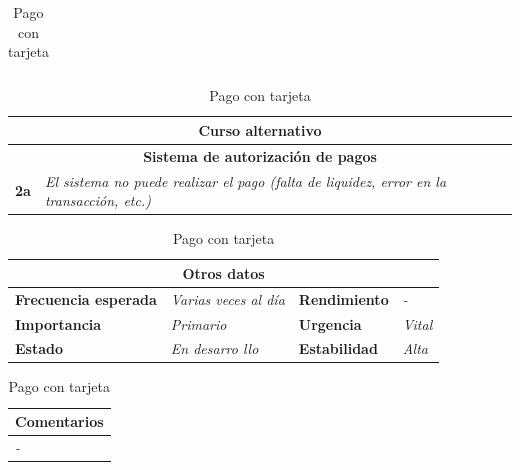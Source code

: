 \documentclass[12pt,spanish]{article}
\begin{document}
\begin{table}[H]
\begin{tabular}{|m{5pt}|m{7.33cm}|m{5pt}|m{7.33cm}|}
	\end{tabular}
	
	\vspace{0.5cm}
	
	\begin{tabular}{|m{12pt}|m{19.66cm}|}
		\hline
		\multicolumn{2}{|c|}{\textbf{Curso alternativo}} \\
		\hline
		\multicolumn{2}{|c|}{\textbf{Sistema de autorización de pagos}} \\
		\hline
		\textbf{2a} & \textit{El sistema no puede realizar el pago (falta de liquidez, error en la transacción, etc.)} \\
		\hline
	
	\end{tabular}
	
	\vspace{0.5cm}
	\begin{tabular}{|m{3.75cm}|m{3.75cm}|m{3.75cm}|m{3.8cm}|}
		\hline
		\multicolumn{4}{|c|}{\textbf{Otros datos}} \\
		\hline
		\textbf{Frecuencia esperada} & \textit{Varias veces al día} & \textbf{Rendimiento} & \textit{-} \\
		\hline
		\textbf{Importancia} & \textit{Primario} & \textbf{Urgencia} & \textit{Vital} \\
		\hline
		\textbf{Estado} & \textit{En desarro
		llo} & \textbf{Estabilidad} & \textit{Alta} \\
		\hline
	\end{tabular}
	
	\vspace{1cm}
	
	\begin{tabular}{|m{16.2cm}|}
		\hline
		\textbf{Comentarios} \\
		\hline
		\textit{-} \\
		\hline
	\end{tabular}
	
	\caption{Pago con tarjeta}
	
\end{table}



\end{document}
